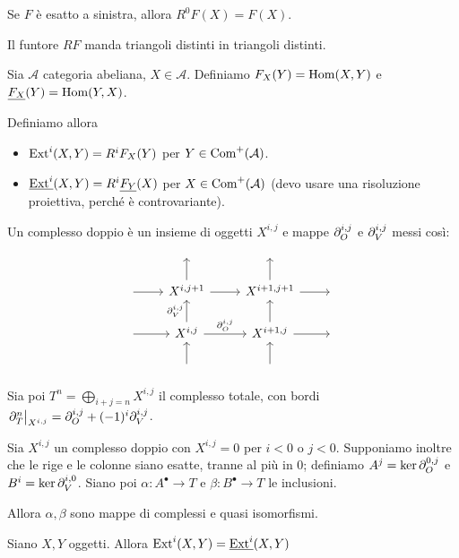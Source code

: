 \begin{oss}
    Se $F$ è esatto a sinistra, allora $R^0F(X)=F(X)$.
\end{oss}

\begin{proposition}
    Il funtore $RF$ manda triangoli distinti in triangoli distinti.
\end{proposition}


\begin{definition}
    Sia $\mathcal A$ categoria abeliana, $X\in\mathcal A$. Definiamo $F_X(Y)=\operatorname{Hom}(X,Y)$ e $\underline{F_X}(Y)=\operatorname{Hom}(Y,X)$.
    
    Definiamo allora
    \begin{itemize}
        \item $\operatorname{Ext}^i(X,Y)=R^iF_X(Y)$ per $Y\in\operatorname{Com}^+(\mathcal A)$.
        \item $\underline{\operatorname{Ext}^i}(X,Y)=R^i\underline{F_Y}(X)$ per $X\in\operatorname{Com}^+(\mathcal A)$ (devo usare una risoluzione proiettiva, perché è controvariante).
    \end{itemize}
\end{definition}


\begin{definition}
    Un complesso doppio è un insieme di oggetti $X^{i,j}$ e mappe $\partial_O^{i,j}$ e $\partial_V^{i,j}$ messi così:
    $$\begin{tikzcd}
    & \, & \, &  \\
    \ar[r] &  X^{i,j+1} \ar[u] \ar[r] & X^{i+1,j+1} \ar[r] \ar[u] &  \, \\
    \ar[r] &  X^{i,j} \ar[u, "\de_V^{i,j}"] \ar[r, "\de_O^{i,j}"] & X^{i+1,j} \ar[r] \ar[u] &  \,  \\
    & \ar[u] & \ar[u] & 
    \end{tikzcd}$$
    
    Sia poi $T^n=\bigoplus_{i+j=n}X^{i,j}$ il complesso totale, con bordi $\left. \partial_T^n \right|_{X^{i,j}}=\partial_O^{i,j}+(-1)^i\partial_V^{i,j}$.
\end{definition}

\begin{proposition}
    Sia $X^{i,j}$ un complesso doppio con $X^{i,j}=0$ per $i<0$ o $j<0$. Supponiamo inoltre che le rige e le colonne siano esatte, tranne al più in $0$; definiamo $A^j=\ker\partial_O^{0,j}$ e $B^i=\ker\partial_V^{i,0}$.
    Siano poi $\alpha:A^\bullet\to T$ e $\beta:B^\bullet\to T$ le inclusioni.
    
    Allora $\alpha,\beta$ sono mappe di complessi e quasi isomorfismi.
\end{proposition}

\begin{proposition}
    Siano $X,Y$ oggetti. Allora $\operatorname{Ext}^i(X,Y)=\underline{\operatorname{Ext}^i}(X,Y)$
\end{proposition}



